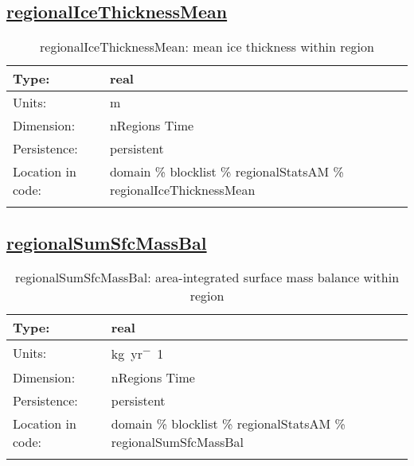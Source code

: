 \subsection[regionalIceThicknessMean]{\hyperref[sec:var_tab_regionalStatsAM]{regionalIceThicknessMean}}
\label{subsec:var_sec_regionalStatsAM_regionalIceThicknessMean}
\begin{center}
\begin{longtable}{| p{2.0in} | p{4.0in} |}
        \hline 
        Type: & real \\
        \hline 
        Units: & \si{m} \\
        \hline 
        Dimension: & nRegions Time \\
        \hline 
        Persistence: & persistent \\
        \hline 
         Location in code: & domain \% blocklist \% regionalStatsAM \% regionalIceThicknessMean \\
         \hline 
    \caption{regionalIceThicknessMean: mean ice thickness within region}
\end{longtable}
\end{center}
\subsection[regionalSumSfcMassBal]{\hyperref[sec:var_tab_regionalStatsAM]{regionalSumSfcMassBal}}
\label{subsec:var_sec_regionalStatsAM_regionalSumSfcMassBal}
\begin{center}
\begin{longtable}{| p{2.0in} | p{4.0in} |}
        \hline 
        Type: & real \\
        \hline 
        Units: & \si{kg.yr^-1} \\
        \hline 
        Dimension: & nRegions Time \\
        \hline 
        Persistence: & persistent \\
        \hline 
         Location in code: & domain \% blocklist \% regionalStatsAM \% regionalSumSfcMassBal \\
         \hline 
    \caption{regionalSumSfcMassBal: area-integrated surface mass balance within region}
\end{longtable}
\end{center}
